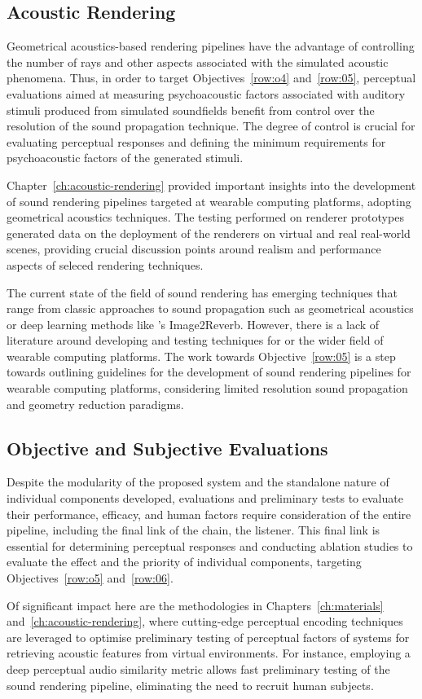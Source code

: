 \subsection{Acoustic Rendering}
Geometrical acoustics-based rendering pipelines have the advantage of controlling the number of rays and other aspects associated with the simulated acoustic phenomena. Thus, in order to target Objectives~\ref{row:o4} and~\ref{row:05}, perceptual evaluations aimed at measuring psychoacoustic factors associated with auditory stimuli produced from simulated soundfields benefit from control over the resolution of the sound propagation technique. The degree of control is crucial for evaluating perceptual responses and defining the minimum requirements for psychoacoustic factors of the generated stimuli.\par
Chapter~\ref{ch:acoustic-rendering} provided important insights into the development of sound rendering pipelines targeted at wearable computing platforms, adopting geometrical acoustics techniques. The testing performed on renderer prototypes generated data on the deployment of the renderers on virtual and real real-world scenes, providing crucial discussion points around realism and performance aspects of seleced rendering techniques.\par
The current state of the field of sound rendering has emerging techniques that range from classic approaches to sound propagation such as geometrical acoustics \citep{savioja2015overview} or deep learning methods like \cite{Singh_2021_ICCV}'s Image2Reverb. However, there is a lack of literature around developing and testing techniques for  or the wider field of wearable computing platforms. The work towards Objective~\ref{row:05} is a step towards outlining guidelines for the development of sound rendering pipelines for wearable computing platforms, considering limited resolution sound propagation and geometry reduction paradigms.

\subsection{Objective and Subjective Evaluations}
Despite the modularity of the proposed system and the standalone nature of individual components developed, evaluations and preliminary tests to evaluate their performance, efficacy, and human factors require consideration of the entire pipeline, including the final link of the chain, the listener. This final link is essential for determining perceptual responses and conducting ablation studies to evaluate the effect and the priority of individual components, targeting Objectives~\ref{row:o5} and~\ref{row:06}.\par
Of significant impact here are the methodologies in Chapters~\ref{ch:materials} and~\ref{ch:acoustic-rendering}, where cutting-edge perceptual encoding techniques are leveraged to optimise preliminary testing of perceptual factors of systems for retrieving acoustic features from virtual environments. For instance, employing a deep perceptual audio similarity metric allows fast preliminary testing of the sound rendering pipeline, eliminating the need to recruit human subjects.

